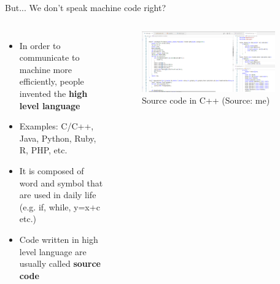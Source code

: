 \documentclass[10pt,xcolor={table,dvipsnames},t]{beamer}
\begin{document}
\begin{frame}{But... We don't speak machine code right?}
  \begin{columns}
    \begin{itemize}
      \item In order to communicate to machine more efficiently, people invented the \textbf{high level language}
      \item Examples: C/C++, Java, Python, Ruby, R, PHP, etc.
      \item It is composed of word and symbol that are used in daily life (e.g. if, while, y=x+c etc.)
      \item Code written in high level language are usually called \textbf{source code}
    \end{itemize}
  

    \begin{figure}
      \includegraphics[width=0.9\textwidth]{img/C++code.png}
      \caption{Source code in C++ (Source: me)}
      \label{fig:python_code}
    \end{figure}
  \end{columns}
  
\end{frame}
\end{document}
